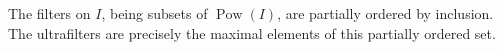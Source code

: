 The filters on $I$, being subsets of $\operatorname{Pow}(I)$, are partially ordered by inclusion. The ultrafilters are precisely the maximal elements of this partially ordered set.
